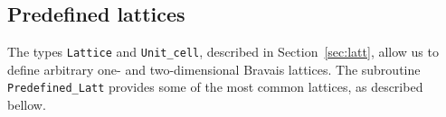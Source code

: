 %
\subsection{Predefined lattices} \label{sec:predefined_lattices}


The types \texttt{Lattice} and \texttt{Unit\_cell}, described in Section~\ref{sec:latt}, allow us to define arbitrary one- and two-dimensional Bravais lattices. The subroutine \texttt{Predefined\_Latt} provides some of the most common lattices, as described bellow.

